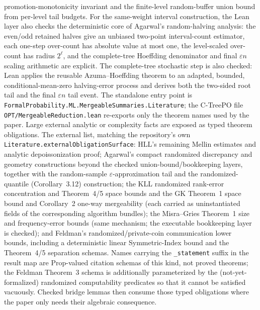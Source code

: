 promotion-monotonicity invariant and the finite-level random-buffer union bound
from per-level tail budgets.
For the same-weight interval construction, the Lean layer also checks the
deterministic core of Agarwal's random-halving analysis: the even/odd retained
halves give an unbiased two-point interval-count estimator, each one-step
over-count has absolute value at most one, the level-scaled over-count has
radius \(2^\ell\), and the complete-tree Hoeffding denominator and final
\(\varepsilon n\) scaling arithmetic are explicit. The complete-tree stochastic
step is also checked: Lean applies the reusable Azuma--Hoeffding theorem to an
adapted, bounded, conditional-mean-zero halving-error process and derives both
the two-sided root tail and the final \(\varepsilon n\) tail event.
The standalone entry point is
\texttt{FormalProbability.ML.MergeableSummaries.Literature}; the C-TreePO file
\texttt{OPT/MergeableReduction.lean} re-exports only the theorem names used by
the paper. Large external analytic or complexity facts are exposed as typed
theorem obligations. The external list, matching the repository's own
\texttt{Literature.externalObligationSurface}: HLL's remaining Mellin
estimates and analytic depoissonization proof; Agarwal's compact randomized
discrepancy and geometry constructions beyond the checked
union-bound/bookkeeping layers, together with the random-sample
\(\varepsilon\)-approximation tail and the randomized-quantile
(Corollary~3.12) construction; the KLL randomized rank-error concentration
and Theorem~4/5 space bounds and the GK Theorem~1 space bound and
Corollary~2 one-way mergeability (each carried as uninstantiated fields of
the corresponding algorithm bundles); the Misra--Gries Theorem~1 size and
frequency-error bounds (same mechanism; the executable bookkeeping layer is
checked); and Feldman's randomized/private-coin communication lower bounds,
including a deterministic linear Symmetric-Index bound and the Theorem~4/5
separation schemas. Names carrying the \texttt{\_statement} suffix in the
result map are Prop-valued citation schemas of this kind, not proved
theorems; the Feldman Theorem~3 schema is additionally parameterized by the
(not-yet-formalized) randomized computability predicates so that it cannot
be satisfied vacuously.
Checked bridge lemmas then consume those typed obligations where the paper only
needs their algebraic consequence.

